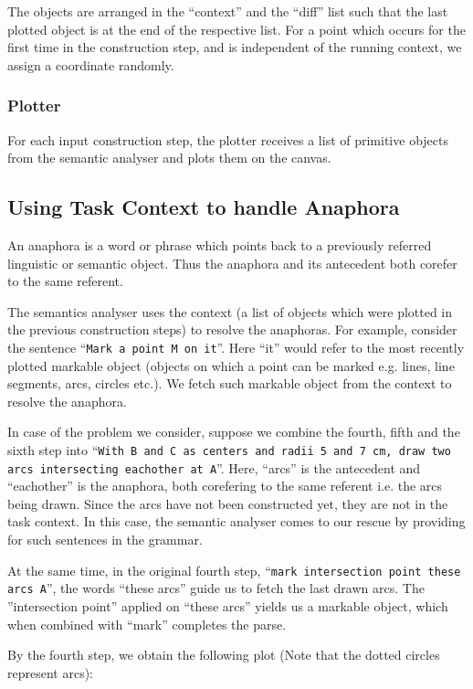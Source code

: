 \def\DevnagVersion{2.15}\documentclass[12pt]{article}
\begin{document}
The objects are arranged in the ``context'' and the ``diff'' list such that the last plotted object is at the end of the respective list. For a point which occurs for the first time in the construction step, and is independent of the running context, we assign a coordinate randomly.

\subsubsection{Plotter}
For each input construction step, the plotter receives a list of primitive objects from the semantic analyser and plots them on the canvas.

\subsection{Using Task Context to handle Anaphora}
An anaphora is a word or phrase which points back to a previously referred linguistic or semantic object.  Thus the anaphora and its antecedent both corefer to the same referent.

The semantics analyser uses the context (a list of objects which were plotted in the previous construction steps) to resolve the anaphoras. For example, consider the sentence ``\texttt{Mark a point M on it}''. Here ``it'' would refer to the most recently plotted markable object (objects on which a point can be marked e.g. lines, line segments, arcs, circles etc.). We fetch such markable object from the context to resolve the anaphora.

In case of the problem we consider, suppose we combine the fourth, fifth and the sixth step into ``\texttt{With B and C as centers and radii 5 and 7 cm, draw two arcs intersecting eachother at A}''. Here, ``arcs'' is the antecedent and ``eachother'' is the anaphora, both corefering to the same referent i.e. the arcs being drawn. Since the arcs have not been constructed yet, they are not in the task context. In this case, the semantic analyser comes to our rescue by providing for such sentences in the grammar.

At the same time, in the original fourth step, ``\texttt{mark intersection point these arcs A}'', the words ``these arcs'' guide us to fetch the last drawn arcs. The ''intersection point'' applied on ``these arcs'' yields us a markable object, which when combined with ``mark'' completes the parse.

By the fourth step, we obtain the following plot (Note that the dotted circles represent arcs):
\end{document}
